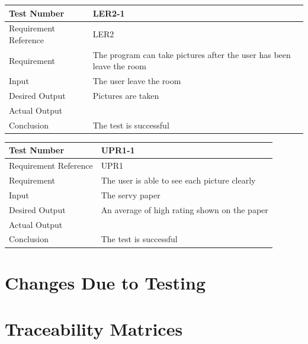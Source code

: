 \documentclass[12pt, titlepage]{article}
\begin{document}
\begin{table}[H]
\begin{center}
\begin{tabular}{|l | m{9cm}|}
\hline
  Test Number & LER2-1\\
  \hline
  Requirement Reference & LER2\\
  \hline
  Requirement & The program can take pictures after the user has been leave the room\\
  \hline
  Input & The user leave the room\\
  \hline
  Desired Output & Pictures are taken\\
  \hline
  Actual Output &\\
  \hline
  Conclusion & The test is successful\\
  \hline
\end{tabular}
\end{center}           
\end{table}

\begin{table}[H]
\begin{center}
\begin{tabular}{|l | m{9cm}|}
\hline
  Test Number & UPR1-1\\
  \hline
  Requirement Reference & UPR1\\
  \hline
  Requirement & The user is able to see each picture clearly\\
  \hline
  Input & The servy paper\\
  \hline
  Desired Output & An average of high rating shown on the paper\\
  \hline
  Actual Output &\\
  \hline
  Conclusion & The test is successful\\
  \hline
\end{tabular}
\end{center}           
\end{table}



\section{Changes Due to Testing}
	
\section{Traceability Matrices}
\end{document}
